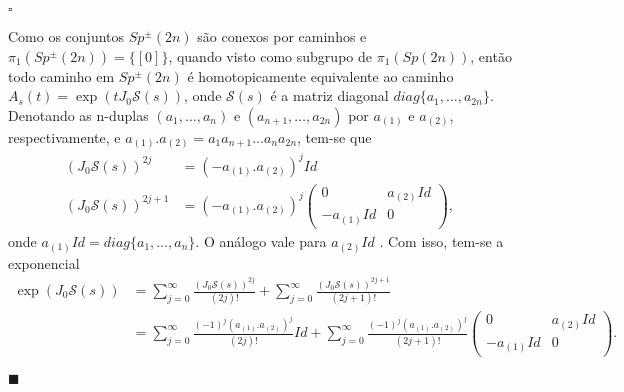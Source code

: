 \documentclass[12pt]{book}
\newenvironment{prova}[1]{$\square$ #1}{\hfill$\blacksquare$}
\newcommand{\classe}[1]{[#1]}
\newcommand{\estruturacomplexa}{J_{0}}
\newcommand{\grupofundamental}[1]{\pi_{1}(#1)}
\newcommand{\gruposimpletico}[1]{Sp(#1)}
\newcommand{\gruposimpleticonaodegenerado}[1]{Sp^{#1}(2n)}
\begin{document}
\begin{prova}
\begin{enumerate}
			Como os conjuntos $\gruposimpleticonaodegenerado{\pm}$ são conexos por caminhos e $\grupofundamental{\gruposimpleticonaodegenerado{\pm}} = \{\classe{0}\}$, quando visto como subgrupo de $\grupofundamental{\gruposimpletico{2n}}$, então todo caminho em $\gruposimpleticonaodegenerado{\pm}$ é homotopicamente equivalente ao caminho $A_{s}(t)=\exp(t\estruturacomplexa \mathcal{S}(s))$, onde $\mathcal{S}(s)$ é a matriz diagonal $diag\{a_{1}, \dots, a_{2n}\}$. Denotando as n-duplas $(a_{1}, \dots, a_{n})$ e $(a_{n+1}, \dots, a_{2n})$ por $a_{(1)}$ e $a_{(2)}$, respectivamente, e $a_{(1)}.a_{(2)} = a_{1}a_{n+1}\dots a_{n}a_{2n}$, tem-se que
			$$
			\begin{aligned}
				(\estruturacomplexa \mathcal{S}(s))^{2j} &=(-a_{(1)}.a_{(2)})^{j} Id
				\\
				(\estruturacomplexa \mathcal{S}(s))^{2j+1} 
				&= (-a_{(1)}.a_{(2)})^{j} 
				\left(
				\begin{array}{cc}
				0 & a_{(2)}Id
				\\
				-a_{(1)}Id & 0  
				\end{array}
				\right),
			\end{aligned}
			$$
			onde $a_{(1)}Id=diag\{a_{1}, \dots, a_{n}\}$. O análogo vale para $a_{(2)}Id$ . Com isso, tem-se a exponencial
			$$
			\begin{aligned}
			\exp(\estruturacomplexa \mathcal{S}(s)) &= \sum_{j=0}^{\infty}\frac{(\estruturacomplexa \mathcal{S}(s))^{2j}}{(2j)!} + \sum_{j=0}^{\infty} \frac{(\estruturacomplexa \mathcal{S}(s))^{2j+1}}{(2j+1)!}
			\\
			&= \sum_{j=0}^{\infty}\frac{(-1)^{j}(a_{(1)}.a_{(2)})^{j}}{(2j)!}Id + \sum_{j=0}^{\infty} \frac{(-1)^{j}(a_{(1)}.a_{(2)})^{j}}{(2j+1)!}	\left(
			\begin{array}{cc}
			0 & a_{(2)}Id
			\\
			-a_{(1)}Id & 0  
			\end{array}
			\right).
			\end{aligned}
			$$
			

\end{enumerate}
\end{prova}
\end{document}
